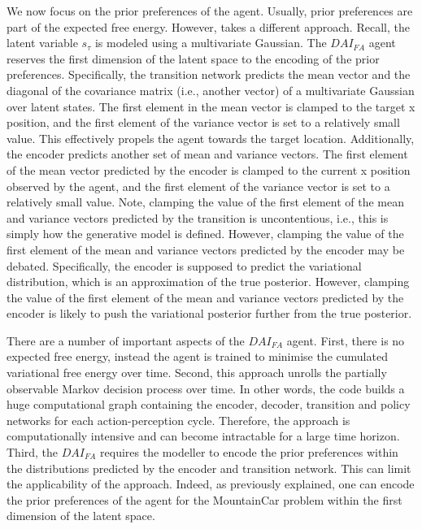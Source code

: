\documentclass[twoside,11pt]{article}
\begin{document}
We now focus on the prior preferences of the agent. Usually, prior preferences are part of the expected free energy. However, \citet{DAI_Kai} takes a different approach. Recall, the latent variable $s_\tau$ is modeled using a multivariate Gaussian. The $DAI_{FA}$ agent reserves the first dimension of the latent space to the encoding of the prior preferences. Specifically, the transition network predicts the mean vector and the diagonal of the covariance matrix (i.e., another vector) of a multivariate Gaussian over latent states. The first element in the mean vector is clamped to the target x position, and the first element of the variance vector is set to a relatively small value. This effectively propels the agent towards the target location. Additionally, the encoder predicts another set of mean and variance vectors. The first element of the mean vector predicted by the encoder is clamped to the current x position observed by the agent, and the first element of the variance vector is set to a relatively small value. Note, clamping the value of the first element of the mean and variance vectors predicted by the transition is uncontentious, i.e., this is simply how the generative model is defined. However, clamping the value of the first element of the mean and variance vectors predicted by the encoder may be debated. Specifically, the encoder is supposed to predict the variational distribution, which is an approximation of the true posterior. However, clamping the value of the first element of the mean and variance vectors predicted by the encoder is likely to push the variational posterior further from the true posterior.

There are a number of important aspects of the $DAI_{FA}$ agent. First, there is no expected free energy, instead the agent is trained to minimise the cumulated variational free energy over time. Second, this approach unrolls the partially observable Markov decision process over time. In other words, the code builds a huge computational graph containing the encoder, decoder, transition and policy networks for each action-perception cycle. Therefore, the approach is computationally intensive and can become intractable for a large time horizon. Third, the $DAI_{FA}$ requires the modeller to encode the prior preferences within the distributions predicted by the encoder and transition network. This can limit the applicability of the approach. Indeed, as previously explained, one can encode the prior preferences of the agent for the MountainCar problem within the first dimension of the latent space. 
\end{document}
